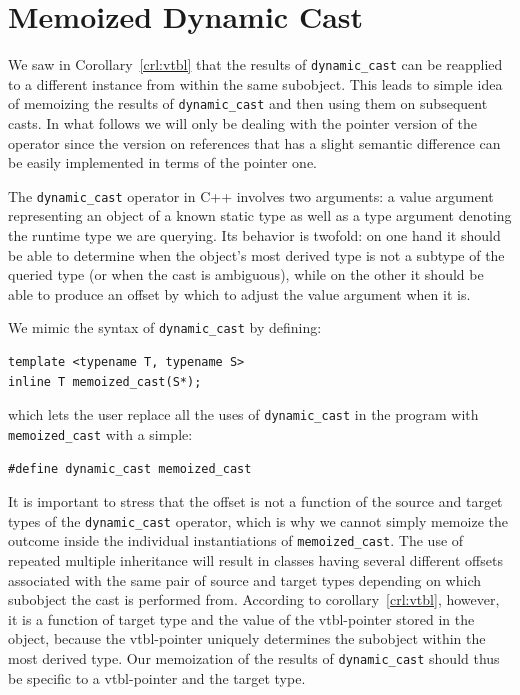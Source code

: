 \documentclass[preprint]{sigplanconf}
\makeatletter
\DeclareRobustCommand{\code}[1]{{\lstinline[breaklines=false,escapechar=@]{#1}}}
\makeatother
\begin{document}
\section{Memoized Dynamic Cast}
\label{sec:memcast}

We saw in Corollary~\ref{crl:vtbl} that the results of \code{dynamic_cast} can 
be reapplied to a different instance from within the same subobject. This leads 
to simple idea of memoizing the results of \code{dynamic_cast} and then using 
them on subsequent casts. In what follows we will only be dealing with the 
pointer version of the operator since the version on references that has a 
slight semantic difference can be easily implemented in terms of the pointer one.

The \code{dynamic_cast} operator in C++ involves two arguments: a value argument 
representing an object of a known static type as well as a type argument 
denoting the runtime type we are querying. Its behavior is twofold: on one hand 
it should be able to determine when the object's most derived type is not a 
subtype of the queried type (or when the cast is ambiguous), while on the other 
it should be able to produce an offset by which to adjust the value argument when it is.

We mimic the syntax of \code{dynamic_cast} by defining:

\begin{lstlisting}
template <typename T, typename S>
inline T memoized_cast(S*);
\end{lstlisting}

\noindent
which lets the user replace all the uses of \code{dynamic_cast} in the program 
with \code{memoized_cast} with a simple:

\begin{lstlisting}
#define dynamic_cast memoized_cast
\end{lstlisting}

\noindent
It is important to stress that the offset is not a function of the source and target 
types of the \code{dynamic_cast} operator, which is why we cannot simply memoize the 
outcome inside the individual instantiations of \code{memoized_cast}.
The use of repeated multiple inheritance will result in classes having several 
different offsets associated with the same pair of source and target types 
depending on which subobject the cast is performed from. According to 
corollary~\ref{crl:vtbl}, however, it is a function of target type and the value 
of the vtbl-pointer stored in the object, because the vtbl-pointer uniquely 
determines the subobject within the most derived type. Our memoization of the 
results of \code{dynamic_cast} should thus be specific to a vtbl-pointer and the 
target type. 
\end{document}

